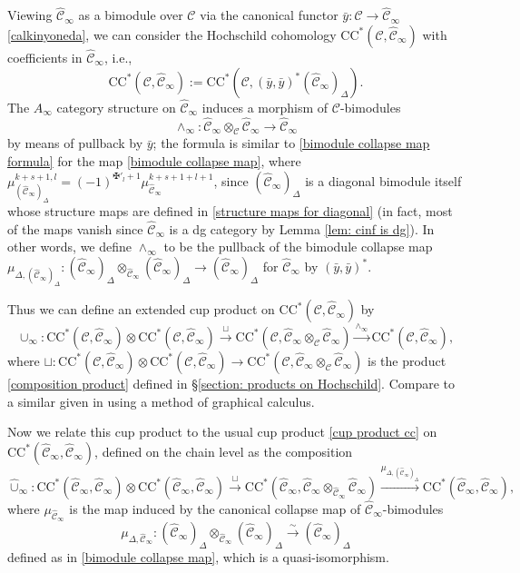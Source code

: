 \documentclass[11pt]{amsproc}
\def\cc{\mathcal{C}}
\def\r#1{\mathrm{#1}}
\def\D{\Delta}
\def\ainf{A_\infty}
\def\cinf{\widehat{\cc}_{\infty}}
\theoremstyle{remark}
\numberwithin{equation}{section}
\begin{document}
Viewing $\cinf$ as a bimodule over $\cc$ via the canonical functor $\bar{y}: \cc \to \cinf$ \eqref{calkinyoneda}, 
we can consider the Hochschild cohomology $\r{CC}^{*}(\cc, \cinf)$ with coefficients in $\cinf$, i.e.,
\begin{equation}
\r{CC}^{*}(\cc, \cinf) := \r{CC}^{*}(\cc, (\bar{y}, \bar{y})^{*}(\cinf)_{\D}).
\end{equation}
The $\ainf$ category structure on $\cinf$ induces a morphism of $\cc$-bimodules
\begin{equation}\label{wedge product}
\wedge_{\infty}: \cinf \otimes_{\cc} \cinf \to \cinf
\end{equation}
by means of pullback by $\bar{y}$;
the formula is similar to \eqref{bimodule collapse map formula} for the map \eqref{bimodule collapse map},
where $\mu^{k+s+1, l}_{(\cinf)_{\D}} = (-1)^{\maltese'_{l}+1} \mu^{k+s+1+l+1}_{\cinf}$, 
since $(\cinf)_{\D}$ is a diagonal bimodule itself whose structure maps are defined in \eqref{structure maps for diagonal}
(in fact, most of the maps vanish since $\cinf$ is a dg category by Lemma \ref{lem: cinf is dg}).
In other words, we define $\wedge_{\infty}$ to be the pullback of the bimodule collapse map $\mu_{\D, (\cinf)_{\D}}: (\cinf)_{\D} \otimes_{\cinf} (\cinf)_{\D} \to (\cinf)_{\D}$ for $\cinf$ by $(\bar{y}, \bar{y})^{*}$.

Thus we can define an extended cup product on $\r{CC}^{*}(\cc, \cinf)$ by
\begin{equation}\label{extended cup product}
\cup_{\infty}: \r{CC}^{*}(\cc, \cinf) \otimes \r{CC}^{*}(\cc, \cinf) \stackrel{\sqcup} \to \r{CC}^{*}(\cc, \cinf \otimes_{\cc} \cinf) \stackrel{\wedge_{\infty}}\to \r{CC}^{*}(\cc, \cinf),
\end{equation}
where $\sqcup: \r{CC}^{*}(\cc, \cinf) \otimes \r{CC}^{*}(\cc, \cinf) \to \r{CC}^{*}(\cc, \cinf \otimes_{\cc} \cinf)$ is the product \eqref{composition product} defined in \S\ref{section: products on Hochschild}.
Compare to a similar given in \cite{rivera-takeda-wang} using a method of graphical calculus.

Now we relate this cup product to the usual cup product \eqref{cup product cc} on $\r{CC}^{*}(\cinf, \cinf)$,
defined on the chain level as the composition
\begin{equation}\label{cup product on cinf}
\widehat{\cup}_{\infty}: \r{CC}^{*}(\cinf, \cinf) \otimes \r{CC}^{*}(\cinf, \cinf) \stackrel{\sqcup}\to \r{CC}^{*}(\cinf, \cinf \otimes_{\cinf} \cinf) \stackrel{\mu_{\D, (\cinf)_{\D}}}\to \r{CC}^{*}(\cinf, \cinf),
\end{equation}
where $\mu_{\cinf}$ is the map induced by the canonical collapse map of $\cinf$-bimodules
\begin{equation}
\mu_{\D, \cinf}: (\cinf)_{\D} \otimes_{\cinf} (\cinf)_{\D} \stackrel{\sim}\to (\cinf)_{\D}
\end{equation} 
defined as in \eqref{bimodule collapse map},
which is a quasi-isomorphism.
\end{document}
